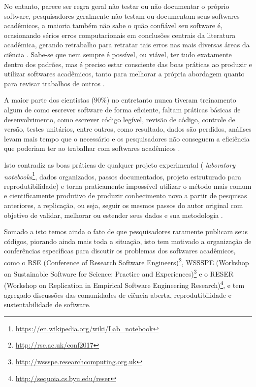 No entanto, parece ser regra geral não testar ou não documentar o próprio
software, pesquisadores geralmente não testam ou documentam seus softwares
acadêmicos, a maioria também não sabe o quão confiável seu software é,
ocasionando sérios erros computacionais em conclusões centrais da literatura
acadêmica, gerando retrabalho para retratar tais erros nas mais diversas áreas
da ciência \cite{Merali2010Computational}. Sabe-se que nem sempre é possível,
ou viável, ter tudo exatamente dentro dos padrões, mas é preciso estar
consciente das boas práticas ao produzir e utilizar softwares acadêmicos, tanto
para melhorar a própria abordagem quanto para revisar trabalhos de outros
\cite{wilson2014best}.

A maior parte dos cientistas (90\%) no entretanto nunca tiveram treinamento
algum de como escrever software de forma eficiente, faltam práticas básicas de
desenvolvimento, como escrever código legível, revisão de código, controle de
versão, testes unitários, entre outros, como resultado, dados são perdidos,
análises levam mais tempo que o necessário e os pesquisadores não conseguem a
eficiência que poderiam ter ao trabalhar com softwares acadêmicos
\cite{wilson2017good}.

Isto contradiz as boas práticas de qualquer projeto experimental ({\it
laboratory
notebooks}\footnote{\url{https://en.wikipedia.org/wiki/Lab_notebook}}, dados
organizados, passos documentados, projeto estruturado para reprodutibilidade) e
torna praticamente impossível utilizar o método mais comum e cientificamente
produtivo de produzir conhecimento novo a partir de pesquisas anteriores, a
replicação, ou seja, seguir os mesmos passos do autor original com objetivo de
validar, melhorar ou estender seus dados e sua metodologia
\cite{king1995replication, Stodden2010}.

Somado a isto temos ainda o fato de que pesquisadores raramente publicam seus
códigos, piorando ainda mais toda a situação, isto tem motivado a organização
de conferências específicas para discutir os problemas dos softwares
acadêmicos, como o RSE (Conference of Research Software Engineers)\footnote{
\url{http://rse.ac.uk/conf2017}}, WSSSPE (Workshop on Sustainable Software for
Science: Practice and Experiences)\footnote{
\url{http://wssspe.researchcomputing.org.uk}} e o RESER (Workshop on
Replication in Empirical Software Engineering Research)\footnote{
\url{http://sequoia.cs.byu.edu/reser}}, e tem agregado discussões das
comunidades de ciência aberta, reprodutibilidade e sustentabilidade de
software.

